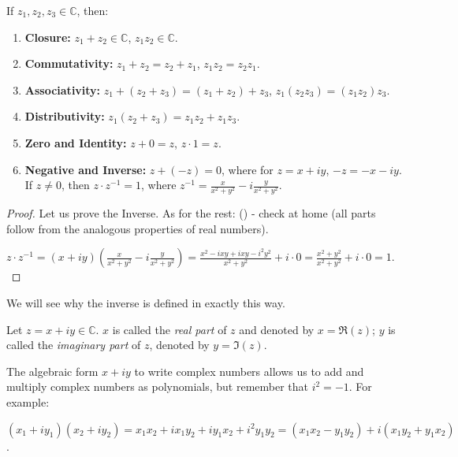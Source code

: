 \begin{proposition}
If $z_1, z_2, z_3 \in \mathbb{C}$, then:
\begin{enumerate}
    \item \textbf{Closure:} $z_1 + z_2 \in \mathbb{C}$, $z_1 z_2 \in \mathbb{C}$.
    \item \textbf{Commutativity:} $z_1 + z_2 = z_2 + z_1$, $z_1 z_2 = z_2 z_1$.
    \item \textbf{Associativity:} $z_1 + (z_2 + z_3) = (z_1 + z_2) + z_3$, $z_1 (z_2 z_3) = (z_1 z_2) z_3$.
    \item \textbf{Distributivity:} $z_1 (z_2 + z_3) = z_1 z_2 + z_1 z_3$.
    \item \textbf{Zero and Identity:} $z + 0 = z$, $z \cdot 1 = z$.
    \item \textbf{Negative and Inverse:} $z + (-z) = 0$, where for $z = x + iy$, $-z = -x - iy$.  If $z \neq 0$, then $z \cdot z^{-1} = 1$, where $z^{-1} = \frac{x}{x^2 + y^2} - i \frac{y}{x^2 + y^2}$.
\end{enumerate}
\end{proposition}

\begin{proof}
Let us prove the Inverse. As for the rest: (\verifythis) - check at home (all parts follow from the analogous properties of real numbers).

$z \cdot z^{-1} = (x+iy) \left( \frac{x}{x^2+y^2} - i \frac{y}{x^2+y^2} \right) = \frac{x^2 - ixy + ixy - i^2y^2}{x^2 + y^2} + i \cdot 0 = \frac{x^2+y^2}{x^2+y^2} + i \cdot 0= 1.$
\end{proof}

We will see why the inverse is defined in exactly this way.

\begin{definition}
Let $z = x + iy \in \mathbb{C}$. $x$ is called the \emph{real part} of $z$ and denoted by $x = \Re(z)$; $y$ is called the \emph{imaginary part} of $z$, denoted by $y = \Im(z)$.
\end{definition}

The algebraic form $x+iy$ to write complex numbers allows us to add and multiply complex numbers as polynomials, but remember that $i^2 = -1$.  For example:

$(x_1 + iy_1)(x_2 + iy_2) = x_1x_2 + ix_1y_2 + iy_1x_2 + i^2y_1y_2 = (x_1x_2 - y_1y_2) + i(x_1y_2 + y_1x_2)$.


